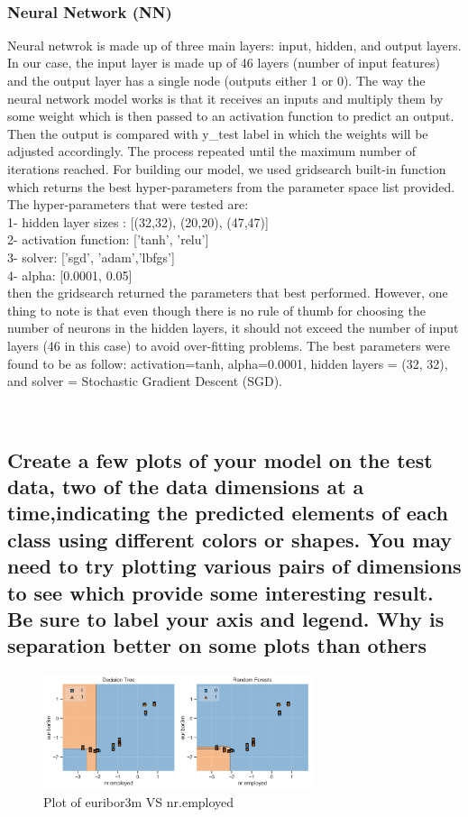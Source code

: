 \\

\subsubsection{Neural Network (NN)}
Neural netwrok is made up of three main layers: input, hidden, and output layers. In our case, the input layer is made up of 46 layers (number of input features) and the output layer has a single node (outputs either 1 or 0). The way the neural network model works is that it receives an inputs and multiply them by some weight which is then passed to an activation function to predict an output. Then the output is compared with y\_test label in which the weights will be adjusted accordingly. The process repeated until the maximum number of iterations reached. For building our model, we used gridsearch built-in function which returns the best hyper-parameters from the parameter space list provided. The hyper-parameters that were tested are:\\
1- hidden layer sizes : [(32,32), (20,20), (47,47)] \\
2- activation function: ['tanh', 'relu'] \\
3- solver: ['sgd', 'adam','lbfgs'] \\
4- alpha: [0.0001, 0.05] \\
then the gridsearch returned the parameters that best performed. However, one thing to note is that even though there is no rule of thumb for choosing the number of neurons in the hidden layers, it should not exceed the number of input layers (46 in this case) to avoid over-fitting problems. 
The best parameters were found to be as follow: activation=tanh, alpha=0.0001, hidden layers = (32, 32), and solver = Stochastic Gradient Descent (SGD). 

\\






\subsection{Create a few plots of your model on the test data, two of the data dimensions at a time,indicating the predicted elements of each class using different colors or shapes. You may need to try plotting various pairs of dimensions to see which provide some interesting result. Be sure to label your axis and legend. Why is separation better on some plots than others}
\begin{figure}[!ht]
 \centering
\includegraphics[width=3.1in]{assignment2/1-4-dT_RF_(euribor3mVSnr.employed).png}
\caption{\label{fig:fig4}Plot of euribor3m VS nr.employed }
\end{figure}
\\


